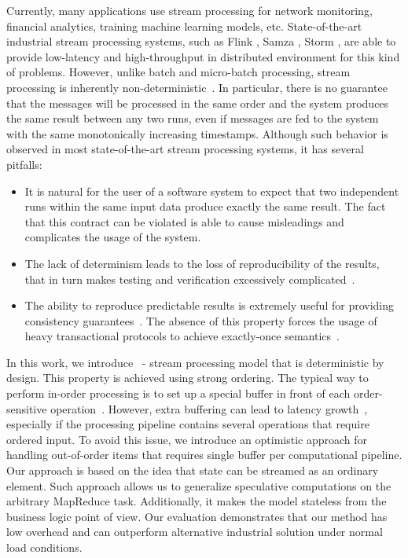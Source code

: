
\label {fs-intro-seciton}

Currently, many applications use stream processing for network monitoring, financial analytics, training machine learning models, etc. State-of-the-art industrial stream processing systems, such as Flink \cite{carbone2015apache}, Samza \cite{Noghabi:2017:SSS:3137765.3137770}, Storm \cite{apache:storm}, are able to provide low-latency and high-throughput in distributed environment for this kind of problems. However, unlike batch and micro-batch processing, stream processing is inherently non-deterministic~\cite{Zaharia:2012:DSE:2342763.2342773}. In particular, there is no guarantee that the messages will be processed in the same order and the system produces the same result between any two runs, even if messages are fed to the system with the same monotonically increasing timestamps. Although such behavior is observed in most state-of-the-art stream processing systems, it has several pitfalls:

\begin{itemize}
  \item It is natural for the user of a software system to expect  that two independent runs within the same input data produce exactly the same result. The fact that this contract can be violated is able to cause misleadings and complicates the usage of the system.

  \item The lack of determinism leads to the loss of reproducibility of the results, that in turn makes testing and verification excessively complicated~\cite{Zacheilas:2017:MDS:3093742.3093921}.

  \item The ability to reproduce predictable results is extremely useful for providing consistency guarantees~\cite{Stonebraker:2005:RRS:1107499.1107504}. The absence of this property forces the usage of heavy transactional protocols to achieve exactly-once semantics~\cite{Carbone:2017:SMA:3137765.3137777, jacques2016consistent}.
\end{itemize}

In this work, we introduce \FlameStream\ - stream processing model that is deterministic by design. This property is achieved using strong ordering. The typical way to perform in-order processing is to set up a special buffer in front of each order-sensitive operation~\cite{Li:2008:OPN:1453856.1453890}. However, extra buffering can lead to latency growth~\cite{Zacheilas:2017:MDS:3093742.3093921}, especially if the processing pipeline contains several operations that require ordered input. To avoid this issue, we introduce an optimistic approach for handling out-of-order items that requires single buffer per computational pipeline. Our approach is based on the idea that state can be streamed as an ordinary element. Such approach allows us to generalize speculative computations on the arbitrary MapReduce task. Additionally, it makes the model stateless from the business logic point of view. Our evaluation demonstrates that our method has low overhead and can outperform alternative industrial solution under normal load conditions.

